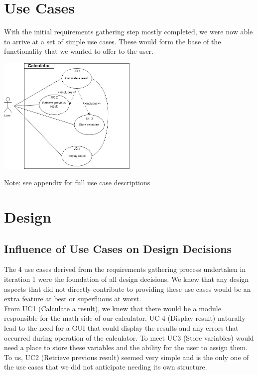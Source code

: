 \documentclass[a4paper, 12pt]{article}
\begin{document}
\section{Use Cases}

With the initial requirements gathering step mostly completed, we were now able to arrive at a set of simple use cases. These would form the base of the functionality that we wanted to offer to the user.

\begin{center}
\includegraphics[width=0.5\textwidth]{UseCaseDiagram.jpg}
\end{center}

\begin{center}
Note: see appendix for full use case descriptions
\end{center}

\section{Design}

\subsection{Influence of Use Cases on Design Decisions}

The 4 use cases derived from the requirements gathering process undertaken in iteration 1 were the foundation of all design decisions. We knew that any design aspects that did not directly contribute to providing these use cases would be an extra feature at best or superfluous at worst.
\\

From UC1 (Calculate a result), we knew that there would be a module responsible for the math side of our calculator. UC 4 (Display result) naturally lead to the need for a GUI that could display the results and any errors that occurred during operation of the calculator. To meet UC3 (Store variables) would need a place to store these variables and the ability for the user to assign them. To us, UC2 (Retrieve previous result) seemed very simple and is the only one of the use cases that we did not anticipate needing its own structure.
\end{document}
